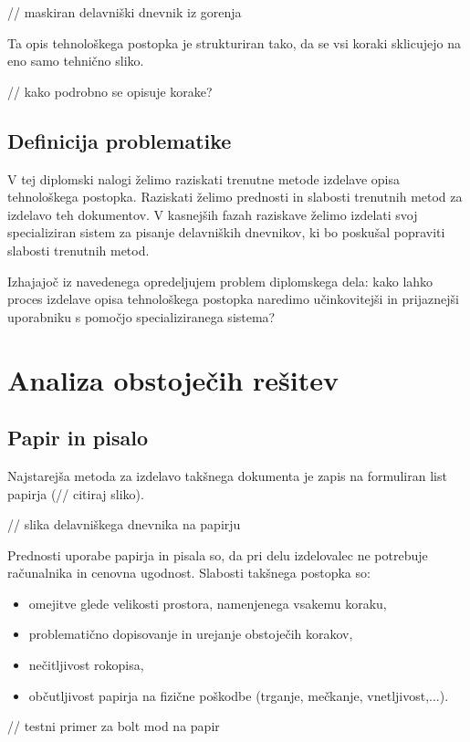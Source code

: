 \documentclass[a4paper, 12pt]{book}
\begin{document}
// maskiran delavniški dnevnik iz gorenja

Ta opis tehnološkega postopka je strukturiran tako, da se vsi koraki sklicujejo na eno samo tehnično sliko.

// kako podrobno se opisuje korake?

\subsection{Definicija problematike}

V tej diplomski nalogi želimo raziskati trenutne metode izdelave opisa tehnološkega postopka.
Raziskati želimo prednosti in slabosti trenutnih metod za izdelavo teh dokumentov.
V kasnejših fazah raziskave želimo izdelati svoj specializiran sistem za pisanje delavniških dnevnikov, ki bo poskušal popraviti slabosti trenutnih metod.

Izhajajoč iz navedenega opredeljujem problem diplomskega dela: kako lahko proces izdelave opisa tehnološkega postopka naredimo učinkovitejši in prijaznejši uporabniku s pomočjo specializiranega sistema?

\section{Analiza obstoječih rešitev}

\subsection{Papir in pisalo}

Najstarejša metoda za izdelavo takšnega dokumenta je zapis na formuliran list papirja (// citiraj sliko).

// slika delavniškega dnevnika na papirju

Prednosti uporabe papirja in pisala so, da pri delu izdelovalec ne potrebuje računalnika in cenovna ugodnost.
Slabosti takšnega postopka so:
\begin{itemize}
	\item omejitve glede velikosti prostora, namenjenega vsakemu koraku,
	\item problematično dopisovanje in urejanje obstoječih korakov,
	\item nečitljivost rokopisa,
	\item občutljivost papirja na fizične poškodbe (trganje, mečkanje, vnetljivost,...).
\end{itemize}

// testni primer za bolt mod na papir
\end{document}
